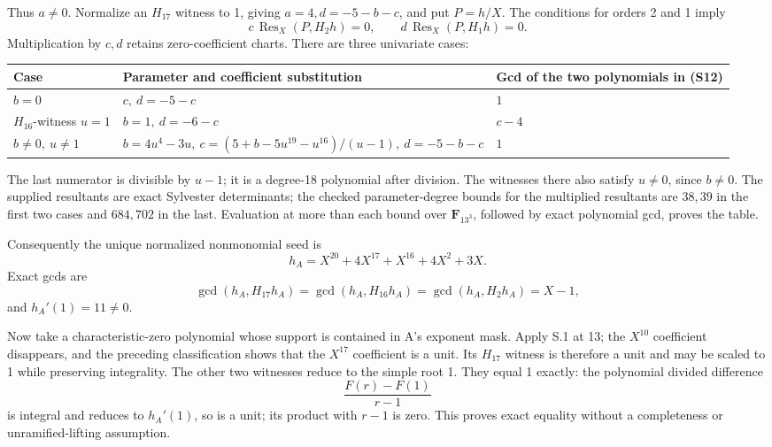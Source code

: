 \documentclass[
  british,
  10pt,
]{article}
\newcounter{none} %
\begin{document}
Thus \(a\ne0\). Normalize an \(H_{17}\) witness to 1, giving
\(a=4,d=-5-b-c\), and put \(P=h/X\). The conditions for orders 2 and 1
imply \[
c\,\operatorname{Res}_X(P,H_2h)=0,\qquad
d\,\operatorname{Res}_X(P,H_1h)=0.
\tag{S12}
\] Multiplication by \(c,d\) retains zero-coefficient charts. There are
three univariate cases:

{\def\LTcaptype{none} %
\begin{longtable}[]{@{}
  >{\raggedright\arraybackslash}p{}
  >{\raggedright\arraybackslash}p{}
  >{\raggedright\arraybackslash}p{}@{}}
\toprule\noalign{}
\begin{minipage}[b]{\linewidth}\raggedright
Case
\end{minipage} & \begin{minipage}[b]{\linewidth}\raggedright
Parameter and coefficient substitution
\end{minipage} & \begin{minipage}[b]{\linewidth}\raggedright
Gcd of the two polynomials in (S12)
\end{minipage} \\
\midrule\noalign{}
\endhead
\bottomrule\noalign{}
\endlastfoot
\(b=0\) & \(c,\ d=-5-c\) & \(1\) \\
\(H_{16}\)-witness \(u=1\) & \(b=1,\ d=-6-c\) & \(c-4\) \\
\(b\ne0,\ u\ne1\) &
\(b=4u^4-3u,\ c=(5+b-5u^{19}-u^{16})/(u-1),\ d=-5-b-c\) & \(1\) \\
\end{longtable}
}

The last numerator is divisible by \(u-1\); it is a degree-18 polynomial
after division. The witnesses there also satisfy \(u\ne0\), since
\(b\ne0\). The supplied resultants are exact Sylvester determinants; the
checked parameter-degree bounds for the multiplied resultants are
\(38,39\) in the first two cases and \(684,702\) in the last. Evaluation
at more than each bound over \(\mathbf F_{13^3}\), followed by exact
polynomial gcd, proves the table.

Consequently the unique normalized nonmonomial seed is \[
h_A=X^{20}+4X^{17}+X^{16}+4X^2+3X.
\] Exact gcds are \[
\gcd(h_A,H_{17}h_A)=\gcd(h_A,H_{16}h_A)
=\gcd(h_A,H_2h_A)=X-1,
\] and \(h_A'(1)=11\ne0\).

Now take a characteristic-zero polynomial whose support is contained in
A's exponent mask. Apply S.1 at 13; the \(X^{10}\) coefficient
disappears, and the preceding classification shows that the \(X^{17}\)
coefficient is a unit. Its \(H_{17}\) witness is therefore a unit and
may be scaled to 1 while preserving integrality. The other two witnesses
reduce to the simple root 1. They equal 1 exactly: the polynomial
divided difference \[
\frac{F(r)-F(1)}{r-1}
\] is integral and reduces to \(h_A'(1)\), so is a unit; its product
with \(r-1\) is zero. This proves exact equality without a completeness
or unramified-lifting assumption.
\end{document}
